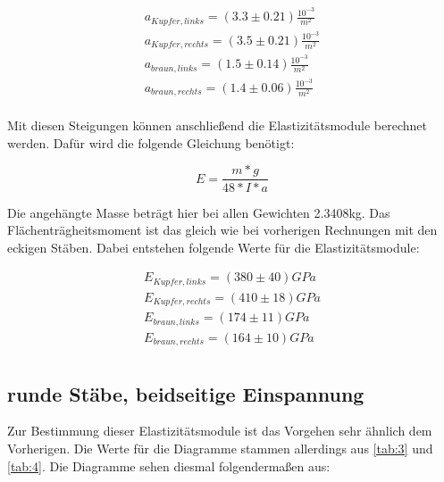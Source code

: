 \begin{align*}
    a_{Kupfer, links} = (3.3\pm 0.21) \frac{10^{-3}}{m^2}\\
    a_{Kupfer, rechts} = (3.5\pm 0.21) \frac{10^{-3}}{m^2}\\
    a_{braun, links} = (1.5\pm 0.14) \frac{10^{-3}}{m^2}\\
    a_{braun, rechts} = (1.4\pm 0.06) \frac{10^{-3}}{m^2}\\
\end{align*}

Mit diesen Steigungen können anschließend die Elastizitätsmodule berechnet werden. Dafür wird die folgende Gleichung benötigt:

\begin{displaymath}
    E = \frac{m*g}{48*I*a}
\end{displaymath}

Die angehängte Masse beträgt hier bei allen Gewichten 2.3408kg. Das Flächenträgheitsmoment ist das gleich wie bei vorherigen Rechnungen mit den eckigen Stäben. Dabei entstehen folgende Werte für die Elastizitätsmodule:

\begin{align*}
    E_{Kupfer, links} = (380\pm 40)GPa\\
    E_{Kupfer, rechts} = (410\pm 18)GPa\\
    E_{braun, links} = (174\pm 11)GPa\\
    E_{braun, rechts} = (164\pm 10)GPa\\
\end{align*}

\subsection{runde Stäbe, beidseitige Einspannung}

Zur Bestimmung dieser Elastizitätsmodule ist das Vorgehen sehr ähnlich dem Vorherigen. Die Werte für die Diagramme stammen allerdings aus \ref{tab:3} und \ref{tab:4}. Die Diagramme sehen diesmal folgendermaßen aus:

